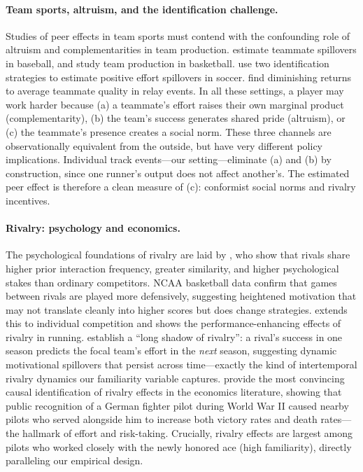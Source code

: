 \documentclass[12pt]{article}
\theoremstyle{definition}
\theoremstyle{remark}
\begin{document}
\paragraph{Team sports, altruism, and the identification challenge.}
Studies of peer effects in team sports must contend with the confounding role
of altruism and complementarities in team production.
\citet{GouldWinter2009} estimate teammate spillovers in baseball, and
\citet{Arcidiacono2017} study team production in basketball.
\citet{CohenZada2024} use two identification strategies to estimate positive effort
spillovers in soccer.
\citet{MoloChik2021} find diminishing returns to average teammate quality in relay
events.
In all these settings, a player may work harder because (a) a teammate's effort
raises their own marginal product (complementarity), (b) the team's success
generates shared pride (altruism), or (c) the teammate's presence creates a social
norm.
These three channels are observationally equivalent from the outside, but have
very different policy implications.
Individual track events---our setting---eliminate (a) and (b) by construction,
since one runner's output does not affect another's. The estimated peer effect
is therefore a clean measure of (c): conformist social norms and rivalry
incentives.

\paragraph{Rivalry: psychology and economics.}
The psychological foundations of rivalry are laid by \citet{KilduffElfenbeinStaw2010},
who show that rivals share higher prior interaction frequency, greater similarity,
and higher psychological stakes than ordinary competitors.
NCAA basketball data confirm that games between rivals are played more defensively,
suggesting heightened motivation that may not translate cleanly into higher scores
but does change strategies.
\citet{Kilduff2014} extends this to individual competition and shows the
performance-enhancing effects of rivalry in running.
\citet{PikeKilduffGalinsky2018} establish a ``long shadow of rivalry'': a rival's
success in one season predicts the focal team's effort in the \textit{next} season,
suggesting dynamic motivational spillovers that persist across time---exactly the
kind of intertemporal rivalry dynamics our familiarity variable captures.
\citet{AgerBursztynLeuchtVoth2022} provide the most convincing causal identification
of rivalry effects in the economics literature, showing that public recognition of
a German fighter pilot during World War II caused nearby pilots who served alongside
him to increase both victory rates and death rates---the hallmark of effort and
risk-taking.
Crucially, rivalry effects are largest among pilots who worked closely with the
newly honored ace (high familiarity), directly paralleling our empirical design.
\end{document}
